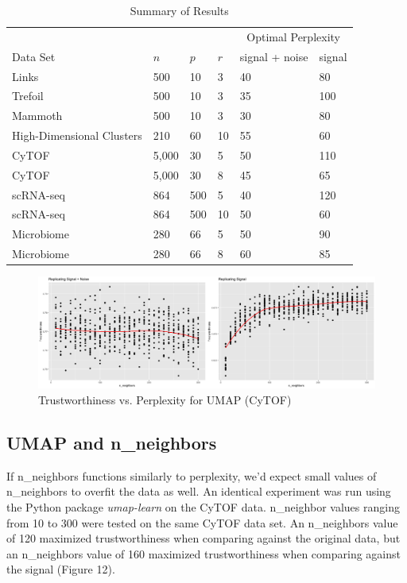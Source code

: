 \documentclass{article}
\begin{document}
\begin{table}[!b]
\centering
\begin{tabular}{@{}llllll@{}}
\toprule 
 & & & & \multicolumn{2}{c}{Optimal Perplexity} \\
\cmidrule{5-6}
Data Set & $n$ & $p$ & $r$ & signal + noise & signal \\
\midrule 
Links \cite{Distill} & 500 & 10 & 3 & 40 & 80 \\
Trefoil \cite{Distill} & 500 & 10 & 3 & 35 & 100 \\
Mammoth \cite{understanding DR} & 500 & 10 & 3 & 30 & 80 \\
High-Dimensional Clusters & 210 & 60 & 10 & 55 & 60 \\
CyTOF \cite{CyTOF data} & 5,000 & 30 & 5 & 50 & 110 \\
CyTOF \cite{CyTOF data} & 5,000 & 30 & 8 & 45 & 65 \\
scRNA-seq \cite{scRNA data} & 864 & 500 & 5 & 40 & 120 \\
scRNA-seq \cite{scRNA data} & 864 & 500 & 10 & 50 & 60 \\
Microbiome \cite{enterotype data} & 280 & 66 & 5 & 50 & 90 \\
Microbiome \cite{enterotype data} & 280 & 66 & 8 & 60 & 85 \\
\bottomrule
\end{tabular}
\caption{Summary of Results}
\end{table}

\renewcommand{\thefigure}{12}
\begin{figure}[t]
\includegraphics[scale=0.22]{trust_plot_umap}
\centering
\caption{Trustworthiness vs. Perplexity for UMAP (CyTOF)}
\end{figure}

\subsection{UMAP and n\_neighbors}
If n\_neighbors functions similarly to perplexity, we'd expect small values of n\_neighbors to overfit the data as well. An identical experiment was run using the Python package \textit{umap-learn} \cite{umap} on the CyTOF data. n\_neighbor values ranging from 10 to 300 were tested on the same CyTOF data set. An n\_neighbors value of 120 maximized trustworthiness when comparing against the original data, but an n\_neighbors value of 160 maximized trustworthiness when comparing against the signal (Figure 12).
\end{document}

